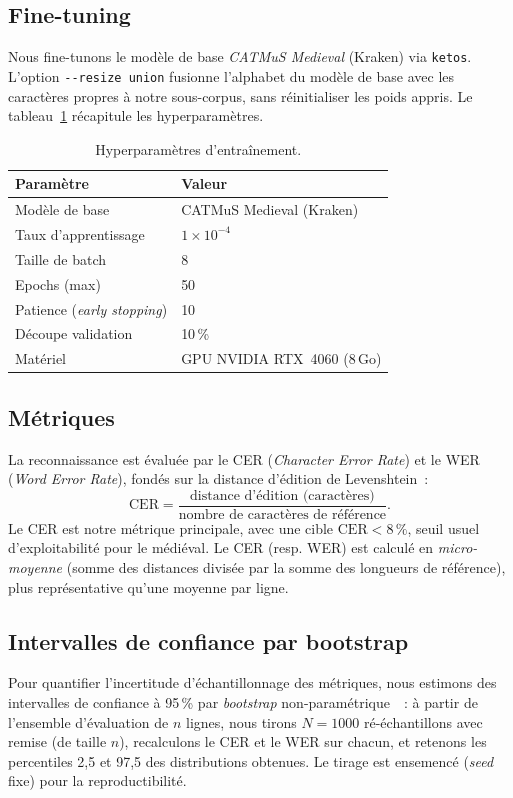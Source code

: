 \documentclass[10pt,journal,a4paper]{IEEEtran}
\begin{document}
\subsection{Fine-tuning}
Nous fine-tunons le modèle de base \textit{CATMuS Medieval} (Kraken) via
\texttt{ketos}. L'option \texttt{-{}-resize union} fusionne l'alphabet du modèle
de base avec les caractères propres à notre sous-corpus, sans réinitialiser les
poids appris. Le tableau~\ref{tab:hp} récapitule les hyperparamètres.

\begin{table}[!t]
\centering
\caption{Hyperparamètres d'entraînement.}
\label{tab:hp}
\begin{tabular}{ll}
\toprule
Paramètre & Valeur \\
\midrule
Modèle de base & CATMuS Medieval (Kraken) \\
Taux d'apprentissage & $1\times10^{-4}$ \\
Taille de batch & 8 \\
Epochs (max) & 50 \\
Patience (\textit{early stopping}) & 10 \\
Découpe validation & 10\,\% \\
Matériel & GPU NVIDIA RTX~4060 (8\,Go) \\
\bottomrule
\end{tabular}
\end{table}

\subsection{Métriques}
La reconnaissance est évaluée par le CER (\textit{Character Error Rate}) et le
WER (\textit{Word Error Rate}), fondés sur la distance d'édition de Levenshtein~:
\begin{equation}
\mathrm{CER} = \frac{\text{distance d'édition (caractères)}}
{\text{nombre de caractères de référence}}.
\end{equation}
Le CER est notre métrique principale, avec une cible $\mathrm{CER} < 8\,\%$,
seuil usuel d'exploitabilité pour le médiéval. Le CER (resp. WER) est calculé en
\emph{micro-moyenne} (somme des distances divisée par la somme des longueurs de
référence), plus représentative qu'une moyenne par ligne.

\subsection{Intervalles de confiance par bootstrap}
Pour quantifier l'incertitude d'échantillonnage des métriques, nous estimons
des intervalles de confiance à 95\,\% par \textit{bootstrap}
non-paramétrique~\cite{efron}~: à partir de l'ensemble d'évaluation de $n$
lignes, nous tirons $N=1000$ ré-échantillons avec remise (de taille $n$),
recalculons le CER et le WER sur chacun, et retenons les percentiles 2,5 et 97,5
des distributions obtenues. Le tirage est ensemencé (\textit{seed} fixe) pour la
reproductibilité.
\end{document}
